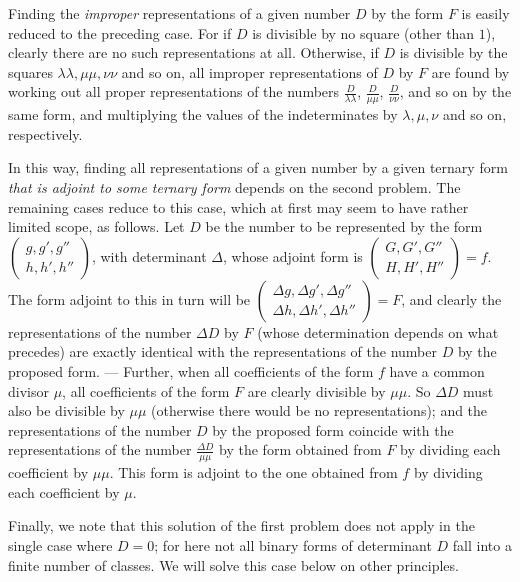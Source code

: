 Finding the \textit{improper} representations of a given number $D$
by the form $F$ is easily reduced to the preceding case. For if $D$
is divisible by no square (other than $1$), clearly there are no such
representations at all. Otherwise, if $D$ is divisible by the squares $\lambda\lambda,\mu\mu,\nu\nu$
and so on, all improper representations of $D$ by $F$ are found
by working out all proper representations of the numbers $\frac{D}{\lambda\lambda}$,
$\frac{D}{\mu\mu}$, $\frac{D}{\nu\nu}$, and so on by the same form, and multiplying the values
of the indeterminates by $\lambda,\mu,\nu$ and so on, respectively.

In this way, finding all representations of a given number by a given
ternary form \textit{that is adjoint to some ternary form} depends on the
second problem. The remaining cases reduce to this case, which at first
may seem to have rather limited scope, as follows. Let $D$ be the
number to be represented by the form
$\left(\begin{smallmatrix}g,g',g''\\h,h',h''\end{smallmatrix}\right)$,
with determinant $\Delta$, whose adjoint form is
$\left(\begin{smallmatrix}G,G',G''\\H,H',H''\end{smallmatrix}\right)=f$.
The form adjoint to this in turn will be
$\left(\begin{smallmatrix}\Delta g,\Delta g',\Delta g''\\\Delta h,\Delta h',\Delta h''\end{smallmatrix}\right)=F$,
and clearly the representations of the number $\Delta D$ by $F$
(whose determination depends on what precedes) are exactly identical
with the representations of the number $D$ by the proposed form.
--- Further, when all coefficients of the form $f$ have a common
divisor $\mu$, all coefficients of the form $F$ are clearly
divisible by $\mu\mu$. So $\Delta D$ must also be divisible by $\mu\mu$
(otherwise there would be no representations); and the representations
of the number $D$ by the proposed form coincide with the representations
of the number $\frac{\Delta D}{\mu\mu}$ by the form obtained from $F$ by dividing each
coefficient by $\mu\mu$. This form is adjoint to the one obtained from
$f$ by dividing each coefficient by $\mu$.

Finally, we note that this solution of the first problem does not apply
in the single case where
$D=0$; for here not all binary forms of determinant $D$ fall into
a finite number of classes. We will solve this case below on other principles.

